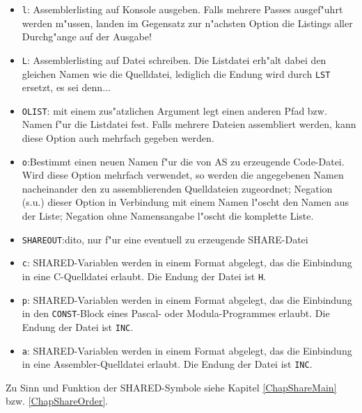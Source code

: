 \documentclass[12pt,a4paper,twoside]{report}
\newcommand{\tty}[1]{{\tt #1}}
\begin{document}
\begin{itemize}
\item{\tty{l}: Assemblerlisting auf Konsole ausgeben.  Falls mehrere
      Passes ausgef"uhrt werden m"ussen, landen im Gegensatz zur
      n"achsten Option die Listings aller Durchg"ange auf der Ausgabe!}
\item{\tty{L}: Assemblerlisting auf Datei schreiben.  Die Listdatei erh"alt
      dabei den gleichen Namen wie die Quelldatei, lediglich die Endung
      wird durch \tty{LST} ersetzt, es sei denn...}
\item{\tty{OLIST}: mit einem zus"atzlichen Argument legt einen anderen
      Pfad bzw. Namen f"ur die Listdatei fest.  Falls mehrere Dateien
      assembliert werden, kann diese Option auch mehrfach gegeben werden.}
\item{\tty{o}:Bestimmt einen neuen Namen f"ur die von AS zu erzeugende
      Code-Datei.  Wird diese Option mehrfach verwendet, so werden
      die angegebenen Namen nacheinander den zu assemblierenden
      Quelldateien zugeordnet; Negation (s.u.) dieser Option in
      Verbindung mit einem Namen l"oscht den Namen aus der Liste;
      Negation ohne Namensangabe l"oscht die komplette Liste.}
\item{\tty{SHAREOUT}:dito, nur f"ur eine eventuell zu erzeugende
      SHARE-Datei}
\item{\tty{c}: SHARED-Variablen werden in einem Format abgelegt, das die
      Einbindung in eine C-Quelldatei erlaubt.  Die Endung der Datei
      ist \tty{H}.}
\item{\tty{p}: SHARED-Variablen werden in einem Format abgelegt, das die
      Einbindung in den \tty{CONST}-Block eines Pascal- oder Modula-Programmes
      erlaubt.  Die Endung der Datei ist \tty{INC}.}
\item{\tty{a}: SHARED-Variablen werden in einem Format abgelegt, das die
      Einbindung in eine Assembler-Quelldatei erlaubt.  Die Endung
      der Datei ist \tty{INC}.}
\end{itemize}
Zu Sinn und Funktion der SHARED-Symbole siehe Kapitel \ref{ChapShareMain}
bzw. \ref{ChapShareOrder}.
\end{document}

